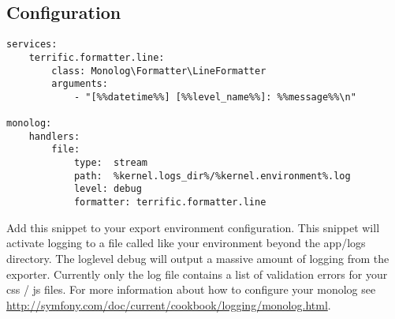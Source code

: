 
\subsection{Configuration}

\begin{verbatim}
services:
    terrific.formatter.line:
        class: Monolog\Formatter\LineFormatter
        arguments:
            - "[%%datetime%%] [%%level_name%%]: %%message%%\n"

monolog:
    handlers:
        file:
            type:  stream
            path:  %kernel.logs_dir%/%kernel.environment%.log
            level: debug
            formatter: terrific.formatter.line
\end{verbatim}

\noindent
Add this snippet to your export environment configuration.
This snippet will activate logging to a file called like your environment beyond the app/logs directory. The loglevel debug will output a massive amount of logging from the exporter. Currently only the log file contains a list of validation errors for your css / js files. For more information about how to configure your monolog see \url{http://symfony.com/doc/current/cookbook/logging/monolog.html}.